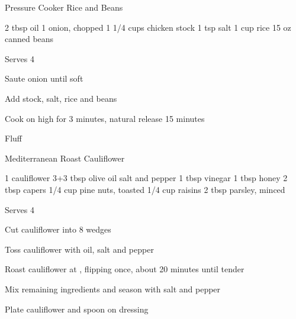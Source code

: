 \begin{recipe}{Pressure Cooker Rice and Beans}{\vegetarian{}}
\begin{ingredients}
2 tbsp oil
1 onion, chopped
1 1/4 cups chicken stock
1 tsp salt
1 cup rice
15 oz canned beans
\end{ingredients}
\nextcolumn
Serves 4
\begin{steps}
    \item Saute onion until soft
    \item Add stock, salt, rice and beans
    \item Cook on high for 3 minutes, natural release 15 minutes
    \item Fluff
\end{steps}
\end{recipe}

\begin{recipe}{Mediterranean Roast Cauliflower}{\vegetarian{}}
\begin{ingredients}
1 cauliflower
3+3 tbsp olive oil
salt and pepper
1 tbsp vinegar
1 tbsp honey
2 tbsp capers
1/4 cup pine nuts, toasted
1/4 cup raisins
2 tbsp parsley, minced
\end{ingredients}
\nextcolumn
Serves 4
\begin{steps}
    \item Cut cauliflower into 8 wedges
    \item Toss cauliflower with oil, salt and pepper
    \item Roast cauliflower at , flipping once, about 20 minutes until tender
    \item Mix remaining ingredients and season with salt and pepper
    \item Plate cauliflower and spoon on dressing
\end{steps}
\end{recipe}

